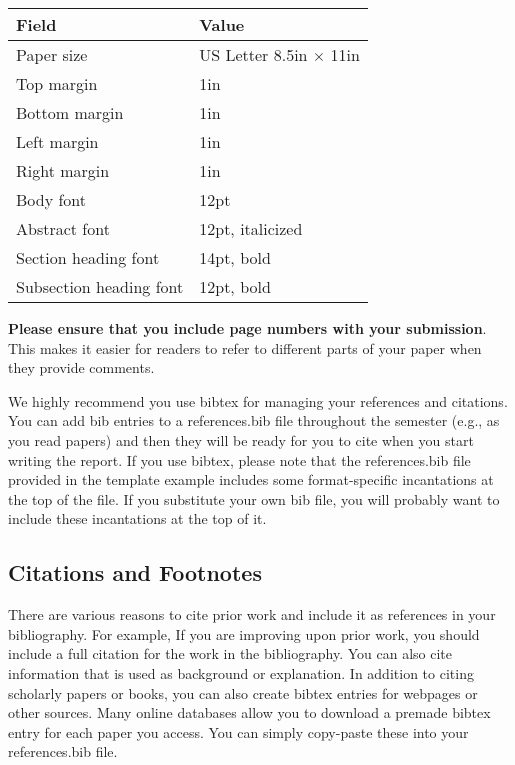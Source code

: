 \documentclass[pageno]{jpaper}
\begin{document}
\begin{table}[hbt]
    \centering
    \begin{tabular}{|l|l|}
        \hline
        \textbf{Field} & \textbf{Value}\\
        \hline
        \hline
        Paper size & US Letter 8.5in $\times$ 11in\\
        \hline
        Top margin & 1in\\
        \hline
        Bottom margin & 1in\\
        \hline
        Left margin & 1in\\
        \hline
        Right margin & 1in\\
        \hline
        Body font & 12pt\\
        \hline
        Abstract font & 12pt, italicized\\
        \hline
        Section heading font & 14pt, bold\\
        \hline
        Subsection heading font & 12pt, bold\\
        \hline
    \end{tabular}
  \end{table}

  \textbf{Please ensure that you include page numbers with your
  submission}. This makes it easier for readers to refer to
  different parts of your paper when they provide comments.

  We highly recommend you use bibtex for managing your references and citations.  You can add bib entries to a references.bib file throughout the semester (e.g., as you read papers) and then they will be ready for you to cite when you start writing the report.  If you use bibtex, please note that the references.bib file provided in the template example includes some format-specific incantations at the top of the file.  If you substitute your own bib file, you will probably want to include these
  incantations at the top of it.

  \subsection{Citations and Footnotes}

  There are various reasons to cite prior work and include it as references in your bibliography.  For example, If you are improving upon
  prior work, you should include
  a full citation for the work in the bibliography.
  You can also cite information that is used as background or
  explanation.  In addition to citing scholarly papers or books, you can
  also create bibtex entries for webpages or other sources.  Many online
  databases allow you to download a premade bibtex entry for each paper
  you access.  You can simply copy-paste these into your references.bib
  file.
\end{document}
